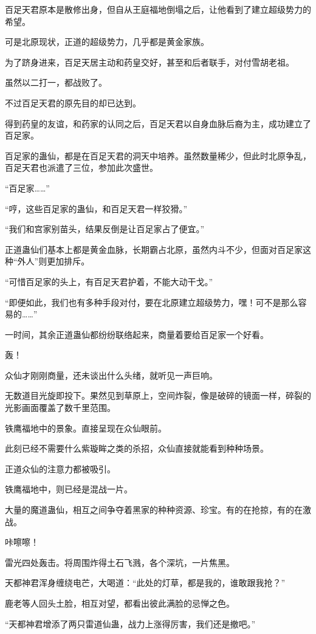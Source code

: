 \begin{this_body}
百足天君原本是散修出身，但自从王庭福地倒塌之后，让他看到了建立超级势力的希望。

可是北原现状，正道的超级势力，几乎都是黄金家族。

为了跻身进来，百足天居主动和药皇交好，甚至和后者联手，对付雪胡老祖。

虽然以二打一，都战败了。

不过百足天君的原先目的却已达到。

得到药皇的友谊，和药家的认同之后，百足天君以自身血脉后裔为主，成功建立了百足家。

百足家的蛊仙，都是在百足天君的洞天中培养。虽然数量稀少，但此时北原争乱，百足天君也派遣了三位，参加此次盛世。

“百足家……”

“哼，这些百足家的蛊仙，和百足天君一样狡猾。”

“我们和宫家别苗头，结果反倒是让百足家占了便宜。”

正道蛊仙们基本上都是黄金血脉，长期霸占北原，虽然内斗不少，但面对百足家这种“外人”则更加排斥。

“可惜百足家的头上，有百足天君护着，不能大动干戈。”

“即便如此，我们也有多种手段对付，要在北原建立超级势力，嘿！可不是那么容易的……”

一时间，其余正道蛊仙都纷纷联络起来，商量着要给百足家一个好看。

轰！

众仙才刚刚商量，还未谈出什么头绪，就听见一声巨响。

无数道目光旋即投下。果然见到草原上，空间炸裂，像是破碎的镜面一样，碎裂的光影画面覆盖了数千里范围。

铁鹰福地中的景象。直接呈现在众仙眼前。

此刻已经不需要什么紫璇眸之类的杀招，众仙直接就能看到种种场景。

正道众仙的注意力都被吸引。

铁鹰福地中，则已经是混战一片。

大量的魔道蛊仙，相互之间争夺着黑家的种种资源、珍宝。有的在抢掠，有的在激战。

咔嚓嚓！

雷光四处轰击。将周围炸得土石飞溅，各个深坑，一片焦黑。

天都神君浑身缠绕电芒，大喝道：“此处的灯草，都是我的，谁敢跟我抢？”

鹿老等人回头土脸，相互对望，都看出彼此满脸的忌惮之色。

“天都神君增添了两只雷道仙蛊，战力上涨得厉害，我们还是撤吧。”


\end{this_body}
